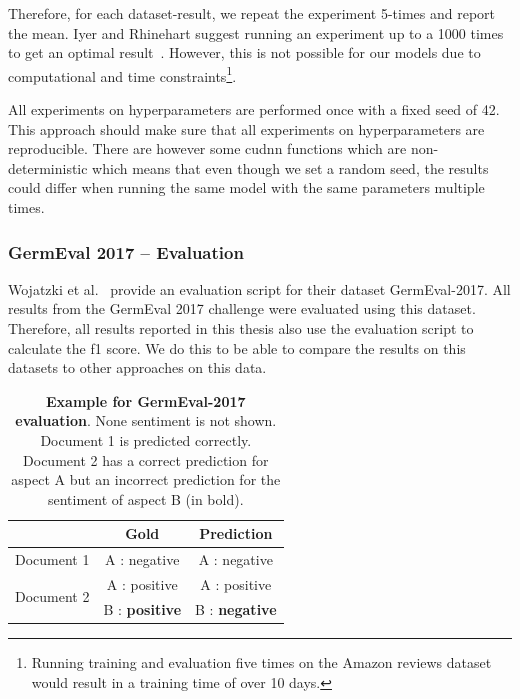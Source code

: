 Therefore, for each dataset-result, we repeat the experiment 5-times and report the mean. Iyer and Rhinehart suggest running an experiment up to a 1000 times to get an optimal result~\cite{Iyer1999}. However, this is not possible for our models due to computational and time constraints\footnote{Running training and evaluation five times on the Amazon reviews dataset would result in a training time of over 10 days.}.
\medskip

All experiments on hyperparameters are performed once with a fixed seed of 42. This approach should make sure that all experiments on hyperparameters are reproducible. There are however some \gls{cudnn} functions which are non-deterministic which means that even though we set a random seed, the results could differ when running the same model with the same parameters multiple times.

\subsubsection*{GermEval 2017 -- Evaluation}
\label{sec:05_GermEvalEvaluation}

Wojatzki et al.~\cite{Wojatzki} provide an evaluation script for their dataset GermEval-2017. All results from the GermEval 2017 challenge were evaluated using this dataset. Therefore, all results reported in this thesis also use the evaluation script to calculate the f1 score. We do this to be able to compare the results on this datasets to other approaches on this data.

\begin{table}
    \centering
    \caption{\textbf{Example for GermEval-2017 evaluation}. None sentiment is not shown. Document 1 is predicted correctly. Document 2 has a correct prediction for aspect A but an incorrect prediction for the sentiment of aspect B {(in bold)}.}
    \begin{tabular}{@{}lcc}
        \toprule 
        & \textbf{Gold} & \textbf{Prediction} \\ 
        \midrule 
        Document 1 & A : negative & A : negative \\
        \midrule 
        \multirow{2}{*}{Document 2} & A : positive & A : positive \\
        & B : \textbf{positive} & B : \textbf{negative} \\ 
        \bottomrule 
    \end{tabular}
    \label{tab:05_germevalEvaluationExample}

\end{table}

